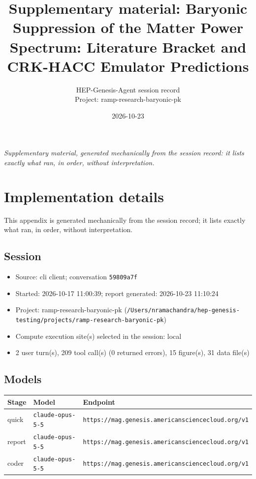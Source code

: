 \documentclass[11pt,a4paper]{article}
\title{Supplementary material: Baryonic Suppression of the Matter Power Spectrum: Literature Bracket and CRK-HACC Emulator Predictions}
\author{HEP-Genesis-Agent session record \\ \small Project: ramp-research-baryonic-pk}
\date{2026-10-23}
\begin{document}
\maketitle
\noindent\textit{\small Supplementary material, generated mechanically from the session record: it lists exactly what ran, in order, without interpretation.}
\vspace{1em}



\appendix
\section{Implementation details}
\label{app:impl}
This appendix is generated mechanically from the session record; it lists exactly what ran, in order, without interpretation.
\subsection{Session}
\begin{itemize}
  \item Source: cli client; conversation \texttt{59809a7f}
  \item Started: 2026-10-17 11:00:39; report generated: 2026-10-23 11:10:24
  \item Project: ramp-research-baryonic-pk (\texttt{/\allowbreak{}Users/\allowbreak{}nramachandra/\allowbreak{}hep-genesis-testing/\allowbreak{}projects/\allowbreak{}ramp-research-baryonic-pk})
  \item Compute execution site(s) selected in the session: local
  \item 2 user turn(s), 209 tool call(s) (0 returned errors), 15 figure(s), 31 data file(s)
\end{itemize}
\subsection{Models}
\begin{longtable}{@{}p{}p{}p{}@{}}
\toprule Stage & Model & Endpoint \\ \midrule \endhead
quick & \texttt{claude-opus-5-5} & \texttt{https:\allowbreak{}/\allowbreak{}/\allowbreak{}mag.genesis.americansciencecloud.org/\allowbreak{}v1} \\
report & \texttt{claude-opus-5-5} & \texttt{https:\allowbreak{}/\allowbreak{}/\allowbreak{}mag.genesis.americansciencecloud.org/\allowbreak{}v1} \\
coder & \texttt{claude-opus-5-5} & \texttt{https:\allowbreak{}/\allowbreak{}/\allowbreak{}mag.genesis.americansciencecloud.org/\allowbreak{}v1} \\
\bottomrule\end{longtable}
\end{document}
